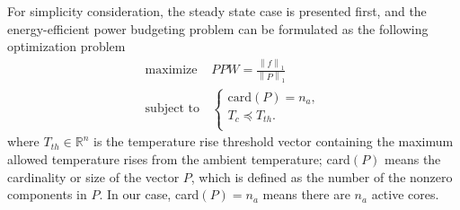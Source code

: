 For simplicity consideration, the steady state case is presented first, and the energy-efficient power budgeting problem can be formulated as the following optimization problem
\begin{equation}\label{eq:opt_ppw}
\begin{split}
\text{maximize } & PPW = \frac{\left \| f \right \|_{1}}{\left \| P \right \|_{1}}\\
\text{subject to} &\left\{
\begin{array}{lr}
\text{card}(P) = n_{a},\\
T_{c} \preceq T_{th}.\\
\end{array}
\right.
\end{split}
\end{equation}
where $T_{th} \in \mathbb{R}^{n}$ is the temperature rise threshold vector containing the maximum allowed temperature rises from the ambient temperature; card$(P)$ means the cardinality or size of the vector $P$, which is defined as the number of the nonzero components in $P$. In our case, card$(P) = n_{a}$ means there are $n_{a}$ active cores.


